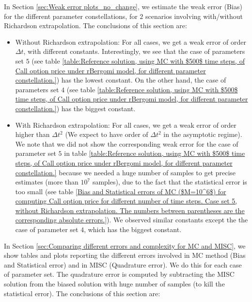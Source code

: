 \documentclass[11pt]{article}
\begin{document}
In Section \ref{sec:Weak error plots_no_change}, we estimate the weak error  (Bias) for the different parameter constellations, for $2$ scenarios involving with/without  Richardson extrapolation. The conclusions of this section are: 
\begin{itemize}
	\item Without Richardson extrapolation: For all cases, we get a weak error of order $\Delta t$, with different  constants. Interestingly, we see that the case of parameters set $5$ (see table \ref{table:Reference solution, using MC with $500$ time steps, of Call option price under rBergomi model, for different parameter constellation.}) has the lowest constant. On the other hand, the case of parameters set $4$ (see table \ref{table:Reference solution, using MC with $500$ time steps, of Call option price under rBergomi model, for different parameter constellation.}) has the biggest constant.
	
		\item With Richardson extrapolation: For all cases, we get a weak error of order higher than  $\Delta t^2$ (We expect to have order of $\Delta t^2$ in the asymptotic regime). We note that we did not show the corresponding weak error for the case of parameter set $5$ in table \ref{table:Reference solution, using MC with $500$ time steps, of Call option price under rBergomi model, for different parameter constellation.} because we needed a huge number of samples to get precise estimates (more than $10^7$ samples), due to the fact that the statistical error is too small (see table \ref{Bias and Statistical errors of MC ($M=10^6$)  for computing Call option price  for different number of time steps. Case set 5, without Richardson extrapolation. The numbers between parentheses are the corresponding absolute errors.}). We observed similar constants except the the case of parameter set $4$, which has the biggest constant.
\end{itemize}

In Section \ref{sec:Comparing different  errors and complexity for MC and MISC}, we show tables and plots reporting  the different errors involved in MC method (Bias and Statistical error) and in MISC (Quadrature error). We do this for each case of parameter set. The quadrature error is computed by subtracting the MISC solution from the biased solution with huge number of samples (to kill the statistical error). The conclusions of this section are: 
\end{document}
